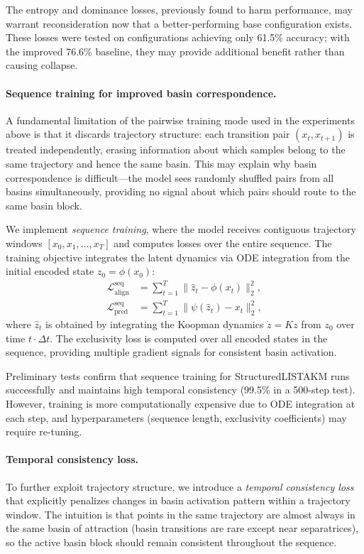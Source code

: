 The entropy and dominance losses, previously found to harm performance, may warrant reconsideration now that a better-performing base configuration exists. These losses were tested on configurations achieving only 61.5\% accuracy; with the improved 76.6\% baseline, they may provide additional benefit rather than causing collapse.

\paragraph{Sequence training for improved basin correspondence.}
A fundamental limitation of the pairwise training mode used in the experiments above is that it discards trajectory structure: each transition pair $(x_t, x_{t+1})$ is treated independently, erasing information about which samples belong to the same trajectory and hence the same basin. This may explain why basin correspondence is difficult---the model sees randomly shuffled pairs from all basins simultaneously, providing no signal about which pairs should route to the same basin block.

We implement \textit{sequence training}, where the model receives contiguous trajectory windows $[x_0, x_1, \ldots, x_T]$ and computes losses over the entire sequence. The training objective integrates the latent dynamics via ODE integration from the initial encoded state $z_0 = \phi(x_0)$:
\begin{align}
    \mathcal{L}_{\text{align}}^{\text{seq}} &= \sum_{t=1}^{T} \| \hat{z}_t - \phi(x_t) \|_2^2, \\
    \mathcal{L}_{\text{pred}}^{\text{seq}} &= \sum_{t=1}^{T} \| \psi(\hat{z}_t) - x_t \|_2^2,
\end{align}
where $\hat{z}_t$ is obtained by integrating the Koopman dynamics $\dot{z} = K z$ from $z_0$ over time $t \cdot \Delta t$. The exclusivity loss is computed over all encoded states in the sequence, providing multiple gradient signals for consistent basin activation.

Preliminary tests confirm that sequence training for StructuredLISTAKM runs successfully and maintains high temporal consistency (99.5\% in a 500-step test). However, training is more computationally expensive due to ODE integration at each step, and hyperparameters (sequence length, exclusivity coefficients) may require re-tuning.

\paragraph{Temporal consistency loss.}
To further exploit trajectory structure, we introduce a \textit{temporal consistency loss} that explicitly penalizes changes in basin activation pattern within a trajectory window. The intuition is that points in the same trajectory are almost always in the same basin of attraction (basin transitions are rare except near separatrices), so the active basin block should remain consistent throughout the sequence.

